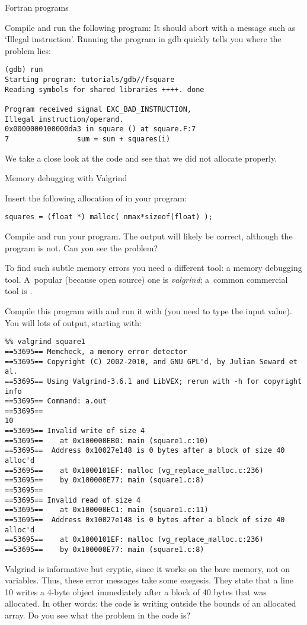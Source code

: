  {Fortran programs}

Compile and run the following program:
It should abort with a message such as `Illegal instruction'.
Running the program in gdb quickly tells you where the problem lies:
\begin{verbatim}
(gdb) run
Starting program: tutorials/gdb//fsquare 
Reading symbols for shared libraries ++++. done

Program received signal EXC_BAD_INSTRUCTION,
Illegal instruction/operand.
0x0000000100000da3 in square () at square.F:7
7                sum = sum + squares(i)
\end{verbatim}
We take a close look at the code and see that we did not allocate
 properly.

 {Memory debugging with Valgrind}
\label{sec:valgrind}

Insert the following allocation of  in your program:
\begin{verbatim}
squares = (float *) malloc( nmax*sizeof(float) );
\end{verbatim}
Compile and run your program. The output will likely be correct,
although the program is not. Can you see the problem?


To find such subtle memory errors you need a different tool: a memory
debugging tool. A~popular (because open source) one is
\emph{valgrind}; a~common commercial tool is .

%
Compile this program with  and run it with
 (you need to type the input value). You will lots
of output, starting with:
{\small
\begin{verbatim}
%% valgrind square1
==53695== Memcheck, a memory error detector
==53695== Copyright (C) 2002-2010, and GNU GPL'd, by Julian Seward et al.
==53695== Using Valgrind-3.6.1 and LibVEX; rerun with -h for copyright info
==53695== Command: a.out
==53695== 
10
==53695== Invalid write of size 4
==53695==    at 0x100000EB0: main (square1.c:10)
==53695==  Address 0x10027e148 is 0 bytes after a block of size 40 alloc'd
==53695==    at 0x1000101EF: malloc (vg_replace_malloc.c:236)
==53695==    by 0x100000E77: main (square1.c:8)
==53695== 
==53695== Invalid read of size 4
==53695==    at 0x100000EC1: main (square1.c:11)
==53695==  Address 0x10027e148 is 0 bytes after a block of size 40 alloc'd
==53695==    at 0x1000101EF: malloc (vg_replace_malloc.c:236)
==53695==    by 0x100000E77: main (square1.c:8)
\end{verbatim}
}
Valgrind is informative but cryptic, since it works on the bare
memory, not on variables. Thus, these error messages take some
exegesis. They state that a line 10 writes a 4-byte object immediately
after a block of 40 bytes that was allocated. In other words: the code
is writing outside the bounds of an allocated array. Do you see what
the problem in the code is?

